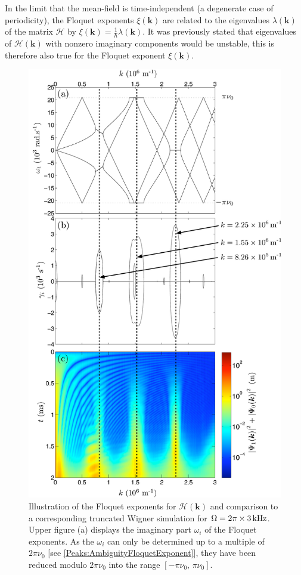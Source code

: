 In the limit that the mean-field is time-independent (a degenerate case of periodicity), the Floquet exponents $\xi(\bm{k})$ are related to the eigenvalues $\lambda(\bm{k})$ of the matrix $\mathcal{H}$ by $\xi(\bm{k}) = \frac{1}{\hbar} \lambda(\bm{k})$. It was previously stated that eigenvalues of $\mathcal{H}(\bm{k})$ with nonzero imaginary components would be unstable, this is therefore also true for the Floquet exponent $\xi(\bm{k})$.

\begin{figure}
    \centering
    \includegraphics[height=19cm]{CondensateEigenvalues}
    \caption{Illustration of the Floquet exponents for $\mathcal{H}(\bm{k})$ and comparison to a corresponding truncated Wigner simulation for $\Omega = 2\pi \times \unit[3]{kHz}$.
        Upper figure (a) displays the imaginary part $\omega_i$ of the Floquet exponents. As the $\omega_i$ can only be determined up to a multiple of $2\pi\nu_0$ [see \eqref{Peaks:AmbiguityFloquetExponent}], they have been reduced modulo $2\pi\nu_0$ into the range $\left[-\pi\nu_0,\, \pi\nu_0\right]$.
}
\end{figure}

